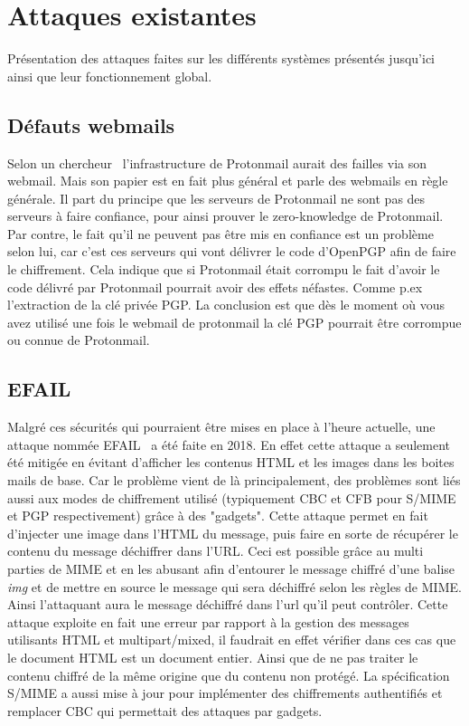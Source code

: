 \section{Attaques existantes}
Présentation des attaques faites sur les différents systèmes présentés jusqu'ici ainsi que leur fonctionnement global.
\subsection{Défauts webmails}
Selon un chercheur~\cite{DBLP:journals/iacr/Kobeissi18a} l'infrastructure de Protonmail aurait des failles via son webmail. Mais son papier est en fait plus général et parle des webmails en règle générale.
Il part du principe que les serveurs de Protonmail ne sont pas des serveurs à faire confiance, pour ainsi prouver le zero-knowledge de Protonmail. Par contre, le fait qu'il ne peuvent pas être mis en confiance est un problème selon lui, car c'est ces serveurs qui vont délivrer le code d'OpenPGP afin de faire le chiffrement. 
Cela indique que si Protonmail était corrompu le fait d'avoir le code délivré par Protonmail pourrait avoir des effets néfastes. Comme p.ex l'extraction de la clé privée PGP. La conclusion est que dès le moment où vous avez utilisé une fois le webmail de protonmail la clé PGP pourrait être corrompue ou connue de Protonmail.
\subsection{EFAIL}
\label{attacks:EFAIL}
Malgré ces sécurités qui pourraient être mises en place à l’heure actuelle, une attaque nommée EFAIL~\cite{DBLP:conf/uss/PoddebniakD0ISF18} a été faite en 2018. En effet cette attaque a seulement été mitigée en évitant d’afficher les contenus HTML et les images dans les boites mails de base. Car le problème vient de là principalement, des problèmes sont liés aussi aux modes de chiffrement utilisé (typiquement CBC et CFB pour S/MIME et PGP respectivement) grâce à des "gadgets".
Cette attaque permet en fait d'injecter une image dans l'HTML du message, puis faire en sorte de récupérer le contenu du message déchiffrer dans l'URL. Ceci est possible grâce au multi parties de MIME et en les abusant afin d'entourer le message chiffré d'une balise \textit{img} et de mettre en source le message qui sera déchiffré selon les règles de MIME. Ainsi l'attaquant aura le message déchiffré dans l'url qu'il peut contrôler. Cette attaque exploite en fait une erreur par rapport à la gestion des messages utilisants HTML et multipart/mixed, il faudrait en effet vérifier dans ces cas que le document HTML est un document entier. Ainsi que de ne pas traiter le contenu chiffré de la même origine que du contenu non protégé. La spécification~\cite{RFC8551} S/MIME a aussi mise à jour pour implémenter des chiffrements authentifiés et remplacer CBC qui permettait des attaques par gadgets.
